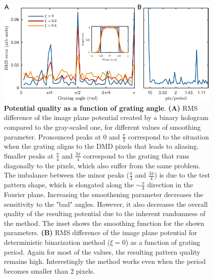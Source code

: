 \begin{figure}[t]
	\centering
	\includegraphics[scale=1]{figures/DMD_K_rotation_v3.pdf}
	\caption{{\bf Potential quality as a function of grating angle}. {\bf (A)} RMS difference of the image plane potential created by a binary hologram compared to the gray-scaled one, for different values of smoothing parameter. Pronounced peaks at $0$ and $\frac{\pi}{2}$ correspond to the situation when the grating aligns to the DMD pixels that leads to aliasing. Smaller peaks at $\frac{\pi}{4}$ and $\frac{3\pi}{4}$ correspond to the grating that runs diagonally to the pixels, which also suffer from the same problem. The imbalance between the minor peaks ($\frac{\pi}{4}$ and $\frac{3\pi}{4}$) is due to the test pattern shape, which is elongated along the $\sim \frac{\pi}{4}$ direction in the Fourier plane. Increasing the smoothening parameter decreases the sensitivity to the "bad" angles. However, it also decreases the overall quality of the resulting potential due to the inherent randomness of the method. The inset shows the smoothing function for the shown parameters. {\bf (B)} RMS difference of the image plane potential for deterministic binarization method ($\xi = 0$) as a function of grating period. Again for most of the values, the resulting pattern quality remains high. Interestingly the method works even when the period becomes smaller than $2$ pixels.}
	\label{fig:DMD_K_rotation}
\end{figure}

